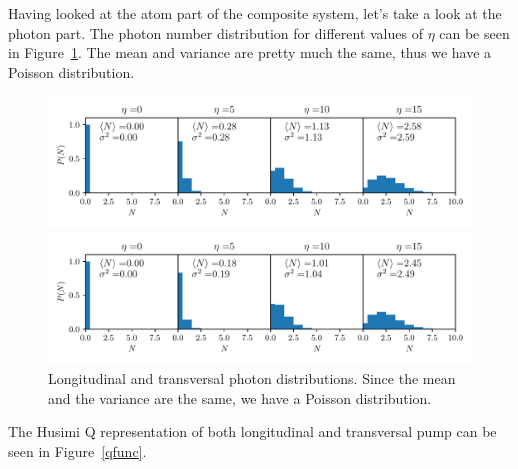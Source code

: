 \noindent Having looked at the atom part of the composite system, let's take a look at the photon part. The photon number distribution for different values of $\eta$ can be seen in Figure~\ref{photon_dist}. The mean and variance are pretty much the same, thus we have a Poisson distribution.

\begin{figure}[!htb]
	\begin{minipage}[b]{1\linewidth}
	\centering
	\includegraphics[width=1\textwidth]{images/pho_dens_long.pdf}
	\end{minipage}
%
	\begin{minipage}[b]{1\linewidth}
	\centering
	\includegraphics[width=1\textwidth]{images/pho_dens_trans.pdf}
	\end{minipage}
\caption{Longitudinal and transversal photon distributions. Since the mean and the variance are the same, we have a Poisson distribution.}
\label{photon_dist}
\end{figure}
\FloatBarrier

\noindent The Husimi Q representation of both longitudinal and transversal pump can be seen in Figure~\ref{qfunc}.

